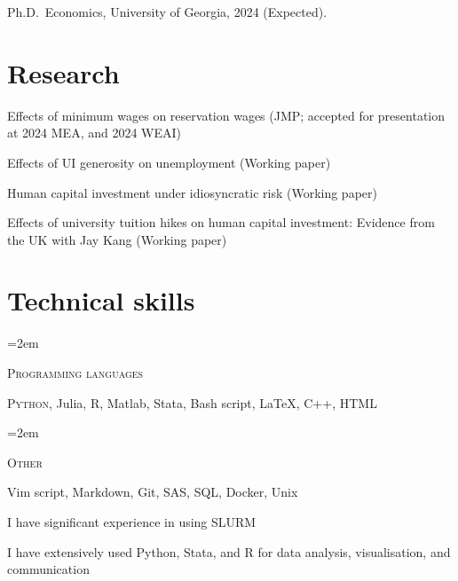 \documentclass[letterpaper]{article}
\newcommand{\skill}[2]{
  \noindent\hangindent=2em\hangafter=0
  \parbox{3\spacebox}{%
  \textsc{#1}} %
  \hfill
  #2 \par
}%
\newlength{\spacebox}
\renewenvironment{itemize}{
  \begin{list}{}{
    \setlength{\leftmargin}{1.5em}
  }
}{
  \end{list}
}
\begin{document}
\begin{itemize}
  \item Ph.D.\ Economics, University of Georgia, 2024 (Expected).





		
\end{itemize}

\section*{Research}
\begin{itemize}
  \item{Effects of minimum wages on reservation wages}{}{ (JMP; accepted for presentation at 2024 MEA, and 2024 WEAI) }
  \item{Effects of UI generosity on unemployment}{}{ (Working paper)}
  \item{Human capital investment under idiosyncratic risk}{}{ (Working paper)}
  \item{Effects of university tuition hikes on human capital investment: Evidence from the UK}{ with Jay Kang}{ (Working paper)}
\end{itemize}

\section*{Technical skills}
\skill{Programming languages}{\textsc{Python}, Julia, R, Matlab, Stata, Bash script, \LaTeX, \textsc{C++}, HTML}
\skill{Other}{Vim script, Markdown, Git, SAS, SQL, Docker, Unix }
\begin{itemize}
  \item I have significant experience in using \textsc{SLURM}
    \item I have extensively used Python, Stata, and R for data analysis, visualisation, and communication
\end{itemize}
\end{document}
